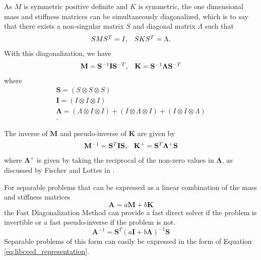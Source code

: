 As $M$ is symmetric positive definite and $K$ is symmetric, the one dimensional mass and stiffness matrices can be simultaneously diagonalized, which is to say that there exists a non-singular matrix $S$ and diagonal matrix $\Lambda$ such that
\begin{equation}
\begin{array}{c c}
S M S^T = I,  &  S K S^T = \Lambda.
\end{array}
\end{equation}
With this diagonalization, we have
\begin{equation}
\begin{array}{c c}
\mathbf{M}   = \mathbf{S}^{-1} \mathbf{I} \mathbf{S}^{-T},  &  \mathbf{K} = \mathbf{S}^{-1} \mathbf{\Lambda} \mathbf{S}^{-T}  \\
\end{array}
\end{equation}
where
\begin{equation}
\begin{array}{c}
\mathbf{S}       = \left( S \otimes S \otimes S \right)  \\
\mathbf{I}       = \left( I \otimes I \otimes I \right)  \\
\mathbf{\Lambda} = \left( \Lambda \otimes I \otimes I \right) + \left( I \otimes \Lambda \otimes I \right) + \left( I \otimes I \otimes \Lambda \right)  \\.
\end{array}
\end{equation}

The inverse of $\mathbf{M}$ and pseudo-inverse of $\mathbf{K}$ are given by
\begin{equation}
\begin{array}{c c}
\mathbf{M}^{-1} = \mathbf{S}^T \mathbf{I} \mathbf{S},  &  \mathbf{K}^{+} = \mathbf{S}^T \mathbf{\Lambda}^{+} \mathbf{S}
\end{array}
\end{equation}
where $\mathbf{\Lambda}^{+}$ is given by taking the reciprocal of the non-zero values in $\mathbf{\Lambda}$, as discussed by Fischer and Lottes in \cite{fischer2005hybrid}.

For separable problems that can be expressed as a linear combination of the mass and stiffness matrices
\begin{equation}
\mathbf{A} = a \mathbf{M} + b \mathbf{K}
\end{equation}
the Fast Diagonalization Method can provide a fast direct solver if the problem is invertible or a fast pseudo-inverse if the problem is not.
\begin{equation}
\mathbf{A}^{-1} = \mathbf{S}^T \left( a \mathbf{I} + b \mathbf{\Lambda} \right)^{-1} \mathbf{S}
\label{eq:fdminverse}
\end{equation}
Separable problems of this form can easily be expressed in the form of Equation \ref{eq:libceed_representation}.

